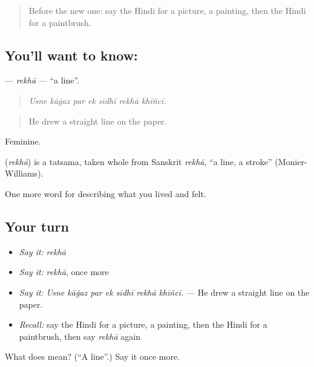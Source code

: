 \begin{quote}
Before the new one: say the Hindi for a picture, a painting, then the Hindi for a paintbrush.
\end{quote}

\subsection*{You'll want to know: }
\textbf{} — \emph{rekhā} — \textquotedblleft{}a line\textquotedblright{}.

\begin{quote}
      
\end{quote}

\begin{quote}
\emph{Usne kāġaz par ek sīdhī rekhā khīñcī.}
\end{quote}

\begin{quote}
He drew a straight line on the paper.
\end{quote}

Feminine.

\begin{cousinweb}
\textbf{} (\emph{rekhā}) is a tatsama, taken whole from Sanskrit \emph{rekhā}, \textquotedblleft{}a line, a stroke\textquotedblright{} (Monier-Williams).
\end{cousinweb}

\begin{grammarlens}[title={What you've built}]
One more word for describing what you lived and felt.
\end{grammarlens}

\subsection*{Your turn}
\begin{itemize}
\raggedright
  \item \emph{Say it:} \emph{rekhā}
  \item \emph{Say it:} \emph{rekhā}, once more
  \item \emph{Say it:} \emph{Usne kāġaz par ek sīdhī rekhā khīñcī.} — He drew a straight line on the paper.
  \item \emph{Recall:} say the Hindi for a picture, a painting, then the Hindi for a paintbrush, then say \emph{rekhā} again
\end{itemize}

\begin{tcolorbox}[breakable,colback=teal!4,colframe=teal!35!black,title={Before you move on}]
What does  mean? (\textquotedblleft{}A line\textquotedblright{}.) Say it once more.
\end{tcolorbox}
